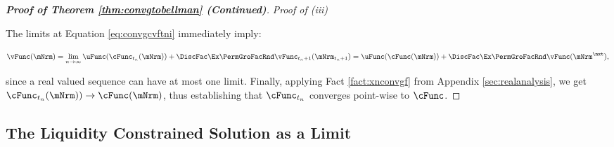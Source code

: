 \documentclass[\econtexRoot/BufferStockTheory]{subfiles}
\begin{document}
\begin{proof}[{\textbf{Proof of Theorem \ref{thm:convgtobellman} (Continued)}}]
\vspace{1em} %
\noindent\textit{Proof of (iii)} %
\vspace{1em} %

The limits at Equation \eqref{eq:convgcvftni} immediately imply:

\begin{equation}
\vFunc(\mNrm) = \lim_{n\rightarrow \infty} \uFunc(\cFunc_{t_{n}}(\mNrm)) + \DiscFac\Ex\PermGroFacRnd\vFunc_{t_{n}+1}(\mNrm_{t_{n}+1}) = \uFunc(\cFunc(\mNrm)) + \DiscFac\Ex\PermGroFacRnd\vFunc(\mNrm^{\nxt}),
\end{equation}

since a real valued sequence can have at most one limit. Finally, applying Fact \ref{fact:xnconvgf} from Appendix \ref{sec:realanalysis}, we get  $\cFunc_{t_{n}}(\mNrm))\rightarrow  \cFunc(\mNrm)$, thus establishing that $\cFunc_{t_{n}}$ converges point-wise to $\cFunc$. 

\end{proof}


\subsection{The Liquidity Constrained Solution as a Limit}\label{sec:LiqConstrAsLimit}
\end{document}
